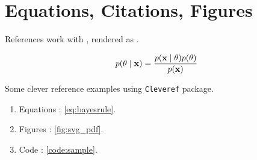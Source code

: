 \documentclass{article}
\begin{document}
\section{Equations, Citations, Figures}

References work with , rendered as \citet{kapoor2020variational}.

\begin{align}
p(\theta \mid {\ensuremath{\boldsymbol{\mathbf{x}}}}) = \frac{p({\boldsymbol{\mathbf{x}}}\mid\theta)p(\theta)}{p({\boldsymbol{\mathbf{x}}})} \label{eq:bayesrule}
\end{align}

Some clever reference examples using \texttt{Cleveref} package.

\begin{enumerate}
\item Equations : \cref{eq:bayesrule}.
\item Figures : \cref{fig:svg_pdf}.
\item Code : \cref{code:sample}.
\end{enumerate}

\clearpage

% 

\end{document}
